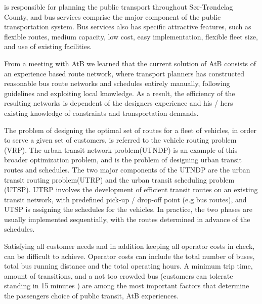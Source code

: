 \citet{website:atb} is responsible for planning the public transport throughout Sør-Trøndelag County, and bus services comprise the major component of the public transportation system. Bus services also has specific attractive features, such as flexible routes, medium capacity, low cost, easy implementation, flexible fleet size, and use of existing facilities. %

From a meeting with AtB we learned that the current solution of AtB consists of an experience based route network, where transport planners has constructed reasonable bus route networks and schedules entirely manually, following guidelines and exploiting local knowledge. As a result, the efficiency of the resulting networks is dependent of the designers experience and his / hers existing knowledge of constraints and transportation demands. 

The problem of designing the optimal set of routes for a fleet of vehicles, in order to serve a given set of customers, is referred to the vehicle routing problem (VRP). The urban transit network problem(UTNDP) is an example of this broader optimization problem, and is the problem of designing urban transit routes and schedules. The two major components of the UTNDP are the urban transit routing problem(UTRP) and the urban transit scheduling problem (UTSP). UTRP involves the development of efficient transit routes on an existing transit network, with predefined pick-up / drop-off point (e.g bus routes), and UTSP is assigning the schedules for the vehicles. In practice, the two phases are usually implemented sequentially, with the routes determined in advance of the schedules.

Satisfying all customer needs and in addition keeping all operator costs in check, can be difficult to achieve. Operator costs can include the total number of buses, total bus running distance and the total operating hours. A minimum trip time, amount of transitions, and a not too crowded bus (customers can tolerate standing in 15 minutes ) are among the most important factors that determine the passengers choice of public transit, AtB experiences. 

